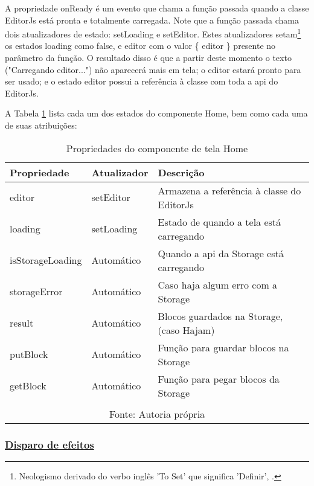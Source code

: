 A propriedade onReady é um evento que chama
a função passada quando a classe EditorJs está pronta e
totalmente carregada. Note que a função passada chama dois
atualizadores de estado: setLoading e setEditor. Estes atualizadores
setam\footnote{Neologismo derivado do verbo inglês 'To Set' que significa 'Definir',
    \cite{setar}.
}
os estados loading como false, e editor com o valor \{ editor \} presente
no parâmetro da função. O resultado disso é que a partir deste momento
o texto ("Carregando editor...") não aparecerá mais em tela; o editor
estará pronto para ser usado; e o estado editor possui a referência
à classe com toda a
\acrshort{api}
do EditorJs.

A
            Tabela \ref{tbl:props-componente-home}
            lista cada um dos estados do componente Home, bem como cada uma de suas
            atribuições:

\begin{table}[H]
    \centering
    \caption{Propriedades do componente de tela Home}
    \label{tbl:props-componente-home}
    \renewcommand{\arraystretch}{1.5}
    \begin{tabular}{p{3.5200cm} p{2.8800cm} p{9.6000cm}}
        \hline
        \textbf{Propriedade} & \textbf{Atualizador} & \textbf{Descrição} \\
        \hline
        editor & setEditor & Armazena a referência à classe do EditorJs \\
		loading & setLoading & Estado de quando a tela está carregando \\
		isStorageLoading & Automático & Quando a \acrshort{api}                    da Storage está carregando \\
		storageError & Automático & Caso haja algum erro com a Storage \\
		result & Automático & Blocos guardados na Storage, (caso Hajam) \\
		putBlock & Automático & Função para guardar blocos na Storage \\
		getBlock & Automático & Função para pegar blocos da Storage \\
        \hline
        \\\multicolumn{3}{c}{\fontsize{10pt}{12pt}Fonte: Autoria própria}
    \end{tabular}
\end{table}

\subsubsection{\underline{Disparo de efeitos}}

